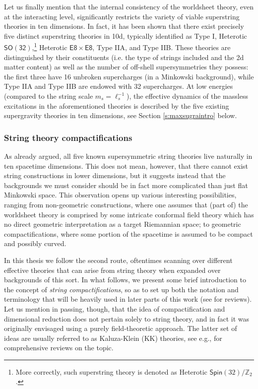 Let us finally mention that the internal consistency of the worldsheet theory, even at the interacting level, significantly restricts the variety of viable superstring theories in ten dimensions. In fact, it has been shown that there exist precisely five distinct superstring theories in 10d, typically identified as Type I, Heterotic $\mathsf{SO(32)}$,\footnote{More correctly, such superstring theory is denoted as Heterotic $\mathsf{Spin}(32)/\mathbb{Z}_2$ \cite{Gross:1985fr}.} Heterotic $\mathsf{E8}\times \mathsf{E8}$, Type IIA, and Type IIB. These theories are distinguished by their constituents (i.e. the type of strings included and the 2d matter content) as well as the number of off-shell supersymmetries they possess: the first three have 16 unbroken supercharges (in a Minkowski background), while Type IIA and Type IIB are endowed with 32 supercharges. At low energies (compared to the string scale $m_s = \ell_s^{-1}$), the effective dynamics of the massless excitations in the aforementioned theories is described by the five existing supergravity theories in ten dimensions, see Section \ref{s:maxsugraintro} below. 


\subsubsection*{String theory compactifications}

As already argued, all five known supersymmetric string theories live naturally in ten spacetime dimensions. This does not mean, however, that there cannot exist string constructions in lower dimensions, but it suggests instead that the backgrounds we must consider should be in fact more complicated than just flat Minkowski space. This observation opens up various interesting possibilities, ranging from non-geometric constructions, where one assumes that (part of) the worldsheet theory is comprised by some intricate conformal field theory which has no direct geometric interpretation as a target Riemannian space; to geometric compactifications, where some portion of the spacetime is assumed to be compact and possibly curved.

In this thesis we follow the second route, oftentimes scanning over different effective theories that can arise from string theory when expanded over backgrounds of this sort. In what follows, we present some brief introduction to the concept of \emph{string compactifications}, so as to set up both the notation and terminology that will be heavily used in later parts of this work (see \cite{Grana:2005jc,Douglas:2023yof,Douglas:2006es} for reviews). Let us mention in passing, though, that the idea of compactification and dimensional reduction does not pertain solely to string theory, and in fact it was originally envisaged using a purely field-theoretic approach. The latter set of ideas are usually referred to as Kaluza-Klein (KK) theories, see e.g., \cite{Bailin:1987jd,Duff:1986hr} for comprehensive reviews on the topic.

